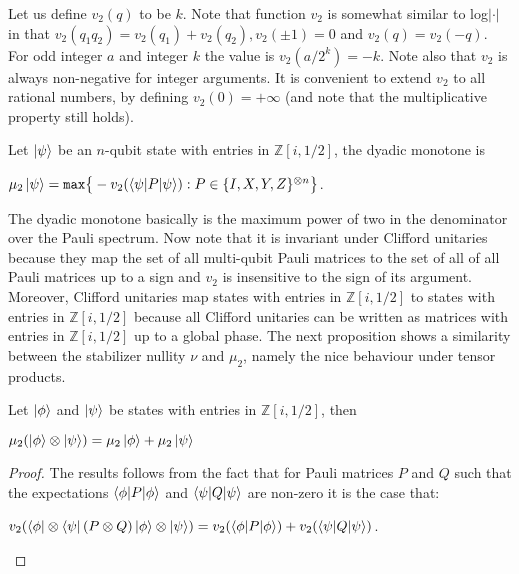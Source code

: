 \documentclass[12pt]{dalthesis}
\begin{document}
Let us define $v_2 (q)$ to be $k$. Note that function $v_2$ is somewhat similar to log$|\cdot|$ in that $v_2(q_1q_2) = v_2(q_1) + v_2(q_2), v_2(\pm 1) = 0$ and $v_2 (q) = v_2 (-q)$. For odd integer $a$ and integer $k$ the value is $v_2 (a/2^k) = - k$. Note also that $v_2$ is always non-negative for integer arguments. It is convenient to extend $v_2$ to all rational numbers, by defining $v_2(0) = + \infty $ (and note that the multiplicative property still holds).
\begin{definition}
Let $\ket{\psi}$ be an $n$-qubit state with entries in $\mathbb{Z}[i, 1/2]$, the dyadic monotone is 
\begin{center}
$\mu_2 \ket{\psi} = \texttt{max} \big\{-v_2(\braket{\psi | P | \psi}): P \in \{I, X, Y, Z \}^{\otimes n} \big\}$.
\end{center}
\end{definition}
The dyadic monotone basically is the maximum power of two in the denominator over the Pauli spectrum. Now note that it is invariant under Clifford unitaries because they map the set of all multi-qubit Pauli matrices to the set of all of all Pauli matrices up to a sign and $v_2$ is insensitive to the sign of its argument. Moreover, Clifford unitaries map states with entries in $\mathbb{Z}[i, 1/2]$ to states with entries in $\mathbb{Z}[i, 1/2]$ because all Clifford unitaries can be written as matrices with entries in $\mathbb{Z}[i, 1/2]$ up to a global phase. The next proposition shows a similarity between the stabilizer nullity $\nu$ and $\mu_2$, namely the nice behaviour under tensor products.

\begin{proposition}
Let $\ket{\phi}$ and $\ket{\psi}$ be states with entries in $\mathbb{Z}[i, 1/2]$, then 
\begin{center}
$\mu_2 (\ket{\phi} \otimes \ket{\psi}) = \mu_2 \ket{\phi} + \mu_2 \ket{\psi}$
\end{center}
\end{proposition}

\begin{proof}
The results follows from the fact that for Pauli matrices $P$ and $Q$ such that the expectations $\braket{\phi | P |\phi}$ and $\braket{\psi | Q | \psi}$ are non-zero it is the case that:
\begin{center}
$v_2 (\bra{\phi} \otimes \bra{\psi} (P \otimes Q) \ket{\phi} \otimes \ket{\psi}) = v_2 (\braket{\phi | P | \phi}) + v_2(\braket{\psi | Q | \psi})$.
\end{center}
\end{proof}
\end{document}
